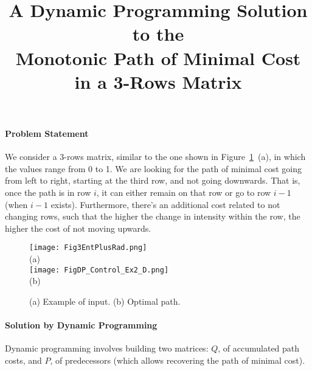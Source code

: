 \documentclass[a4paper,twoside]{article}
\begin{document}
\title{A Dynamic Programming Solution to the\\Monotonic Path of Minimal Cost in a 3-Rows Matrix}

\author{
}



\onecolumn \maketitle \normalsize \vfill


\paragraph{Problem Statement}

We consider a 3-rows matrix, similar to the one shown in Figure~\ref{fig:dp}~(a),
in which the values range from 0 to 1.
We are looking for the path of minimal
cost going from left to right, starting at the third row, and not going downwards.
That is, once the path is in row $i$, it can either remain
on that row or go to row $i-1$ (when $i-1$ exists).
Furthermore, there's an additional cost related to not changing rows,
such that the higher the change in intensity
within the row, the higher the cost of not moving upwards.

\begin{figure}[t!]
\begin{center}
	\texttt{[image: Fig3EntPlusRad.png]}\\
	(a)\\
	\vspace{0.3cm}
	\texttt{[image: FigDP\_Control\_Ex2\_D.png]}\\
	(b)
\end{center}
\caption{(a) Example of input. (b) Optimal path.}
\label{fig:dp}
\end{figure}

\paragraph{Solution by Dynamic Programming}
Dynamic programming involves building two matrices:
$Q$, of accumulated path costs, and $P$, of predecessors (which allows recovering
the path of minimal cost).
\end{document}
